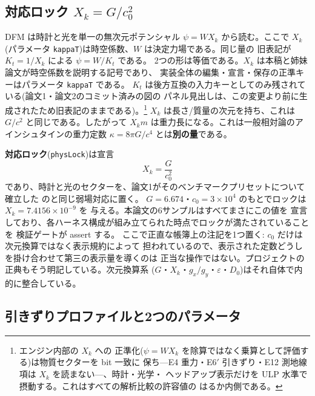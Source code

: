 \documentclass[a4paper,10pt,twocolumn]{ltjsarticle}
\begin{document}
\subsection{対応ロック \texorpdfstring{$X_k=G/c_0^{2}$}{Xk = G/c0 の2乗}}
\label{sec:physlock}

DFM は時計と光を単一の無次元ポテンシャル $\psi = W X_k$ から読む。ここで
$X_k$(パラメータ \texttt{kappaT})は時空係数、$W$ は決定力場である。同じ量の
旧表記が $K_t=1/X_k$ による $\psi=W/K_t$ である。
2つの形は等価である。$X_k$ は本稿と姉妹論文が時空係数を説明する記号であり、
実装全体の編集・宣言・保存の正準キーはパラメータ \texttt{kappaT} である。
$K_t$ は後方互換の入力キーとしてのみ残されている(論文1・論文2のコミット済みの図の
パネル見出しは、この変更より前に生成されたため旧表記のままである)。\footnote{エンジン内部の $X_k$ への
正準化($\psi=W X_k$ を除算ではなく乗算として評価する)は物質セクターを bit 一致に
保ち---E4 重力・E6$'$ 引きずり・E12 測地線項は $X_k$ を読まない---、時計・光学・
ヘッドアップ表示だけを ULP 水準で摂動する。これはすべての解析比較の許容値の
はるか内側である。}
$X_k$ は長さ/質量の次元を持ち、これは $G/c^{2}$ と同じである。したがって
$X_k m$ は重力長になる。これは一般相対論のアインシュタインの重力定数
$\kappa=8\pi G/c^{4}$ とは\textbf{別の量}である。

\textbf{対応ロック}(\texttt{physLock})は宣言
\begin{equation}
  X_k = \frac{G}{c_0^{2}}
  \label{eq:lock}
\end{equation}
であり、時計と光のセクターを、論文1がそのベンチマークプリセットについて確立した
のと同じ弱場対応に置く。
$G=6.674$・$c_0=3\times10^{4}$ のもとでロックは $X_k=7.4156\times10^{-9}$ を
与える。本論文の6サンプルはすべてまさにこの値を
宣言しており、各ハーネス構成が組み立てられた時点でロックが満たされていることを
検証ゲートが assert する。
ここで正直な帳簿上の注記を1つ置く: $c_0$ だけは次元換算ではなく表示規約によって
担われているので、表示された定数どうしを掛け合わせて第三の表示量を導くのは
正当な操作ではない。プロジェクトの正典もそう明記している。次元換算系
($G$・$X_k$・$g_x/g_y$・$\varepsilon$・$D_0$)はそれ自体で内的に整合している。

\subsection{引きずりプロファイルと2つのパラメータ}
\label{sec:profile}
\end{document}
